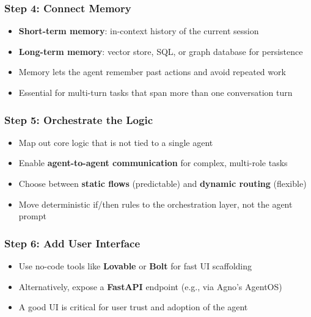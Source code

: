 \begin{frame}[fragile]\frametitle{Step 4: Connect Memory}
      \begin{itemize}
        \item \textbf{Short-term memory}: in-context history of the current session
        \item \textbf{Long-term memory}: vector store, SQL, or graph database for persistence
        \item Memory lets the agent remember past actions and avoid repeated work
        \item Essential for multi-turn tasks that span more than one conversation turn
      \end{itemize}
\end{frame}

\begin{frame}[fragile]\frametitle{Step 5: Orchestrate the Logic}
      \begin{itemize}
        \item Map out core logic that is not tied to a single agent
        \item Enable \textbf{agent-to-agent communication} for complex, multi-role tasks
        \item Choose between \textbf{static flows} (predictable) and \textbf{dynamic routing} (flexible)
        \item Move deterministic if/then rules to the orchestration layer, not the agent prompt
      \end{itemize}
\end{frame}

\begin{frame}[fragile]\frametitle{Step 6: Add User Interface}
      \begin{itemize}
        \item Use no-code tools like \textbf{Lovable} or \textbf{Bolt} for fast UI scaffolding
        \item Alternatively, expose a \textbf{FastAPI} endpoint (e.g., via Agno's AgentOS)
        \item A good UI is critical for user trust and adoption of the agent
      \end{itemize}
\end{frame}

